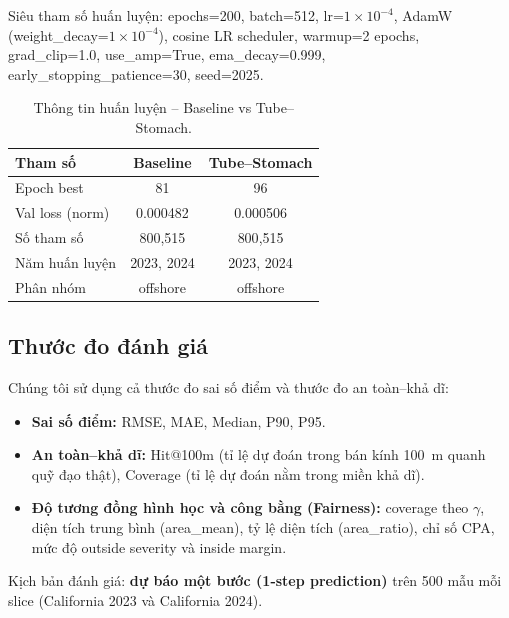 \documentclass{IEEEtran}
\begin{document}
Siêu tham số huấn luyện: epochs=200, batch=512,
lr=$1\times10^{-4}$, AdamW (weight\_decay=$1\times10^{-4}$),
cosine LR scheduler, warmup=2 epochs, grad\_clip=1.0, use\_amp=True,
ema\_decay=0.999, early\_stopping\_patience=30, seed=2025.

\begin{table}[H]
\centering
\renewcommand{\arraystretch}{1.2}
\caption{Thông tin huấn luyện -- Baseline vs Tube--Stomach.}
\label{tab:train-info}
\begin{tabular}{lcc}
\toprule
Tham số & Baseline & Tube--Stomach \\
\midrule
Epoch best      & 81  & 96 \\
Val loss (norm) & 0.000482 & 0.000506 \\
Số tham số      & 800{,}515 & 800{,}515 \\
Năm huấn luyện  & 2023, 2024 & 2023, 2024 \\
Phân nhóm       & offshore & offshore \\
\bottomrule
\end{tabular}
\end{table}

\subsection{Thước đo đánh giá}
Chúng tôi sử dụng cả thước đo sai số điểm và thước đo an toàn--khả dĩ:
\begin{itemize}
  \item \textbf{Sai số điểm:} RMSE, MAE, Median, P90, P95.
  \item \textbf{An toàn--khả dĩ:} Hit@100m (tỉ lệ dự đoán trong bán kính 100~m
        quanh quỹ đạo thật), Coverage (tỉ lệ dự đoán nằm trong miền khả dĩ).
  \item \textbf{Độ tương đồng hình học và công bằng (Fairness):}
        coverage theo $\gamma$, diện tích trung bình (area\_mean),
        tỷ lệ diện tích (area\_ratio), chỉ số CPA,
        mức độ outside severity và inside margin.
\end{itemize}

Kịch bản đánh giá: \textbf{dự báo một bước (1-step prediction)}
trên 500 mẫu mỗi slice (California 2023 và California 2024).
\end{document}
